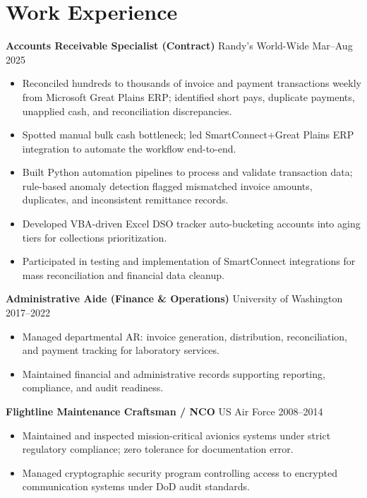\documentclass[11pt,a4paper]{article}
\begin{document}
\section*{Work Experience}

\noindent
\textbf{Accounts Receivable Specialist (Contract)} \hfill Randy's World-Wide \hfill Mar--Aug 2025
\begin{itemize}
    \item Reconciled hundreds to thousands of invoice and payment transactions weekly from Microsoft Great Plains ERP; identified short pays, duplicate payments, unapplied cash, and reconciliation discrepancies.
    \item Spotted manual bulk cash bottleneck; led SmartConnect+Great Plains ERP integration to automate the workflow end-to-end.
    \item Built Python automation pipelines to process and validate transaction data; rule-based anomaly detection flagged mismatched invoice amounts, duplicates, and inconsistent remittance records.
    \item Developed VBA-driven Excel DSO tracker auto-bucketing accounts into aging tiers for collections prioritization.
    \item Participated in testing and implementation of SmartConnect integrations for mass reconciliation and financial data cleanup.
\end{itemize}

\vspace{0.2cm}
\noindent
\textbf{Administrative Aide (Finance \& Operations)} \hfill University of Washington \hfill 2017--2022
\begin{itemize}
    \item Managed departmental AR: invoice generation, distribution, reconciliation, and payment tracking for laboratory services.
    \item Maintained financial and administrative records supporting reporting, compliance, and audit readiness.
\end{itemize}

\vspace{0.2cm}
\noindent
\textbf{Flightline Maintenance Craftsman / NCO} \hfill US Air Force \hfill 2008--2014
\begin{itemize}
    \item Maintained and inspected mission-critical avionics systems under strict regulatory compliance; zero tolerance for documentation error.
    \item Managed cryptographic security program controlling access to encrypted communication systems under DoD audit standards.
\end{itemize}
\end{document}
